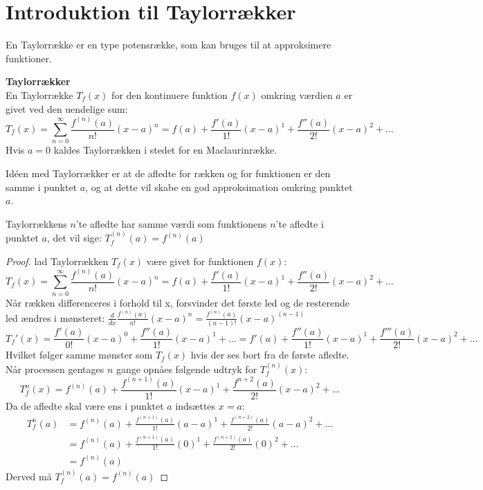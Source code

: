 \chapter{Introduktion til Taylorrækker}
\label{ch:tr}
En Taylorrække er en type potensrække, som kan bruges til at approksimere funktioner.
\begin{defn}
    \textbf{Taylorrækker}\\
    En Taylorrække $T_f(x)$ for den kontinuere funktion $f(x)$ omkring værdien $a$ er givet ved den uendelige sum:
    \[
        T_f(x) = \sum^{\infty}_{n=0} \frac{f^{(n)}(a)}{n!} (x-a)^{n}
        = f(a) + \frac{f'(a)}{1!}(x-a)^{1} + \frac{f''(a)}{2!}(x-a)^{2} + \ldots
    \]
    Hvis $a = 0$ kaldes Taylorrækken i stedet for en Maclaurinrække.
\end{defn}
\label{def:taylorrække} Idéen med Taylorrækker er at de afledte for rækken og for funktionen er den samme i punktet $a$, 
og at dette vil skabe en god approksimation omkring punktet $a$. 
\begin{thm}
    Taylorrækkens $n$'te afledte har samme værdi som funktionens $n$'te afledte i punktet $a$, 
    det vil sige: $T_f^{(n)}(a) = f^{(n)} (a)$
\end{thm}
\begin{proof}
    lad Taylorrækken $T_f(x)$ være givet for funktionen $f(x)$: 
    \[
        T_f(x) = \sum^{\infty}_{n=0} \frac{f^{(n)}(a)}{n!} (x-a)^{n}
        = f(a) + \frac{f'(a)}{1!}(x-a)^{1} + \frac{f''(a)}{2!}(x-a)^{2} + \ldots
    \]
    Når rækken differenceres i forhold til x, forsvinder det første led og de resterende led ændres i mønsteret: $\frac{d}{dx} \frac{f^{(n)}(a)}{n!} (x-a)^{n} = \frac{f^{(n)}(a)}{(n-1)!} (x-a)^{(n - 1)}$ %
    \[
        T_f'(x) = \frac{f'(a)}{0!}(x-a)^0 + \frac{f''(a)}{1!}(x-a)^{1} + \ldots = f'(a) + \frac{f''(a)}{1!}(x-a)^{1} + \frac{f'''(a)}{2!}(x-a)^{2} + \ldots
    \]
    Hvilket følger samme mønster som $T_f(x)$ hvis der ses bort fra de første afledte. %
    Når processen gentages $n$ gange opnåes følgende udtryk for $T_f^{(n)}(x)$:
    \[
        T_f^{n}(x) = f^{(n)}(a) + \frac{f^{(n + 1)}(a)}{1!}(x-a)^{1} + \frac{f^{n + 2}(a)}{2!}(x-a)^{2} + \ldots
    \]
    Da de afledte skal være ens i punktet $a$ indsættes $x = a$:
    \begin{align*}
        T_f^{n}(a) &= f^{(n)}(a) + \frac{f^{(n + 1)}(a)}{1!}(a-a)^{1} + \frac{f^{(n + 2)}(a)}{2!}(a-a)^{2} + \ldots \\
                   &= f^{(n)}(a) + \frac{f^{(n + 1)}(a)}{1!}(0)^{1} + \frac{f^{(n + 2)}(a)}{2!}(0)^{2} + \ldots \\
                   &= f^{(n)}(a)        
    \end{align*}
    Derved må $T_f^{(n)}(a) = f^{(n)}(a)$
\end{proof}
